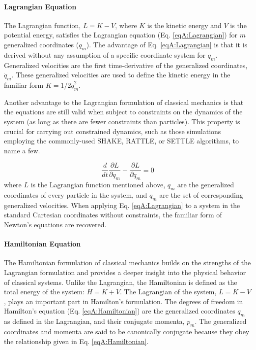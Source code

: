 \paragraph{Lagrangian Equation}

The Lagrangian function, $L = K - V$, where $K$ is the kinetic energy and $V$ is
the potential energy, satisfies the Lagrangian equation (Eq.
\ref{eqA:Lagrangian}) for $m$ generalized coordinates ($q_m$). The advantage of
Eq. \ref{eqA:Lagrangian} is that it is derived without any assumption of a
specific coordinate system for $q_m$. Generalized velocities are the first
time-derivative of the generalized coordinates, $\dot q_m$. These generalized
velocities are used to define the kinetic energy in the familiar form $K = 1/2
\dot q_m ^ 2$.

Another advantage to the Lagrangian formulation of classical mechanics is that
the equations are still valid when subject to constraints on the dynamics of the
system (as long as there are fewer constraints than particles).
\cite{CorbenClassicalMechanics} This property is crucial for carrying out
constrained dynamics, such as those simulations employing the commonly-used
SHAKE, \cite{Ryckaert_JComputPhys_1977_v23_p327} RATTLE, \cite{Andersen1983} or
SETTLE \cite{Miyamoto_JComputChem_1992_v13_p952} algorithms, to name a few.

\begin{equation}
   \frac d {dt} \frac {\partial L} {\partial \dot q_m} - \frac {\partial L}
         {\partial q_m} = 0
   \label{eqA:Lagrangian}
\end{equation}
where $L$ is the Lagrangian function mentioned above, $q_m$ are the generalized
coordinates of every particle in the system, and $\dot q_m$ are the set of
corresponding generalized velocities. When applying Eq. \ref{eqA:Lagrangian} to
a system in the standard Cartesian coordinates without constraints, the familiar
form of Newton's equations are recovered. \cite{CorbenClassicalMechanics}

\paragraph{Hamiltonian Equation}

The Hamiltonian formulation of classical mechanics builds on the strengths of
the Lagrangian formulation and provides a deeper insight into the physical
behavior of classical systems. Unlike the Lagrangian, the Hamiltonian is defined
as the total energy of the system: $H = K + V$. The Lagrangian of the system,
$L = K - V$, plays an important part in Hamilton's formulation. The degrees of
freedom in Hamilton's equation (Eq. \ref{eqA:Hamiltonian}) are the generalized
coordinates $q_m$ as defined in the Lagrangian, and their conjugate momenta,
$p_m$. The generalized coordinates and momenta are said to be canonically
conjugate because they obey the relationship given in Eq. \ref{eqA:Hamiltonian}.
\cite{CorbenClassicalMechanics}

